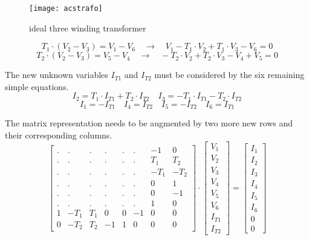 \begin{figure}[ht]
\begin{center}
\texttt{[image: acstrafo]}
\end{center}
\caption{ideal three winding transformer}
\label{fig:acstrafo}
\end{figure}
\FloatBarrier

\begin{equation}
T_{1}\cdot\left(V_{2} - V_{3}\right) = V_{1} - V_{6}
\quad \rightarrow \quad
V_{1} - T_{1}\cdot V_{2} + T_{1}\cdot V_{3} - V_{6} = 0
\end{equation}
\begin{equation}
T_{2}\cdot\left(V_{2} - V_{3}\right) = V_{5} - V_{4}
\quad \rightarrow \quad
- T_{2}\cdot V_{2} + T_{2}\cdot V_{3} - V_{4} + V_{5} = 0
\label{eq:acstrafo}
\end{equation}

The new unknown variables $I_{T1}$ and $I_{T2}$ must be considered by
the six remaining simple equations.
\begin{equation}
I_{2} = T_{1}\cdot I_{T1} + T_{2}\cdot I_{T2} \quad I_{3} = -T_{1}\cdot I_{T1} - T_{2}\cdot I_{T2}
\end{equation}
\begin{equation}
I_{1} = -I_{T1} \quad I_{4} = I_{T2} \quad I_{5} = -I_{T2} \quad I_{6} = I_{T1}
\end{equation}

The matrix representation needs to be augmented by two more new rows
and their corresponding columns.
\begin{equation}
\begin{bmatrix}
.&.&.&.&.&.& -1 & 0\\
.&.&.&.&.&.& T_{1} & T_{2}\\
.&.&.&.&.&.& -T_{1} & -T_{2}\\
.&.&.&.&.&.& 0 & 1\\
.&.&.&.&.&.& 0 & -1\\
.&.&.&.&.&.& 1 & 0\\
1 & -T_{1} & T_{1} & 0 & 0 & -1 & 0 & 0\\
0 & -T_{2} & T_{2} & -1 & 1 & 0 & 0 & 0
\end{bmatrix}
\cdot
\begin{bmatrix}
V_{1}\\
V_{2}\\
V_{3}\\
V_{4}\\
V_{5}\\
V_{6}\\
I_{T1}\\
I_{T2}
\end{bmatrix}
=
\begin{bmatrix}
I_{1}\\
I_{2}\\
I_{3}\\
I_{4}\\
I_{5}\\
I_{6}\\
0\\
0
\end{bmatrix}
\end{equation}

